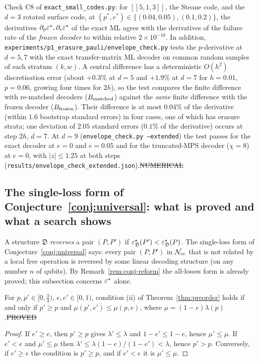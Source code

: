\begin{observation}\label{obs:envelope}
Check C8 of \texttt{exact\_small\_codes.py}: for $[[5,1,3]]$, the Steane code, and the $d=3$ rotated surface code, at $(p^\ast,e^\ast)\in\{(0.04,0.05),(0.1,0.2)\}$,
the derivatives $\partial_p\varepsilon^{\star},\partial_e\varepsilon^{\star}$ of the exact ML agree with the derivatives of the failure rate of the \emph{frozen decoder} to within relative $2\times10^{-10}$.
In addition, \texttt{experiments/p1\_erasure\_pauli/envelope\_check.py} tests the $p$-derivative at $d=5,7$ with the exact transfer-matrix ML decoder on common random samples
of each stratum $(k,w)$. A central difference has a deterministic $O(h^2)$ discretisation error (about $+0.3\%$ at $d=5$ and $+1.9\%$ at $d=7$ for $h=0.01$, $p=0.06$, growing four times for $2h$),
so the test compares the finite difference with re-matched decoders ($B_{\rm matched}$) against the \emph{same} finite difference with the frozen decoder ($B_{\rm frozen}$).
Their difference is at most $0.04\%$ of the derivative (within $1.6$ bootstrap standard errors) in four cases, one of which has erasure strata; one deviation of $2.05$ standard errors ($0.1\%$ of the derivative) occurs at step $2h$, $d=7$.
At $d=9$ (\texttt{envelope\_check.py --extended}) the test passes for the exact decoder at $e=0$ and $e=0.05$ and for the truncated-MPS decoder ($\chi=8$) at $e=0$, with $|z|\le1.25$ at both steps (\texttt{results/envelope\_check\_extended.json}).\hfill\st{NUMERICAL}
\end{observation}

\subsection{The single-loss form of Conjecture~\ref{conj:universal}: what is proved and what a search shows}\label{sec:single-loss}

A structure $\mathfrak D$ \emph{reverses} a pair $(P,P')$ if $\varepsilon^{\star}_{\mathfrak D}(P')<\varepsilon^{\star}_{\mathfrak D}(P)$. The single-loss form of Conjecture~\ref{conj:universal} says: every pair $(P,P')$ in $\mathcal{N}_{\rm cc}$ that is not related by a local free operation is reversed by some linear decoding structure (on any number $n$ of qubits).
By Remark~\ref{rem:conj-reform} the all-losses form is already proved; this subsection concerns $\varepsilon^{\star}$ alone.

\begin{proposition}\label{prop:two-scalars}
For $p,p'\in[0,\tfrac34)$, $e,e'\in[0,1)$, condition (ii) of Theorem~\ref{thm:preorder} holds if and only if $p'\ge p$ and $\mu(p',e')\le\mu(p,e)$, where $\mu=(1-e)\lambda(p)$.\hfill\st{PROVED}
\end{proposition}
\begin{proof}
If $e'\ge e$, then $p'\ge p$ gives $\lambda'\le\lambda$ and $1-e'\le1-e$, hence $\mu'\le\mu$. If $e'<e$ and $\mu'\le\mu$ then $\lambda'\le\lambda(1-e)/(1-e')<\lambda$, hence $p'>p$. Conversely, if $e'\ge e$ the condition is $p'\ge p$, and if $e'<e$ it is $\mu'\le\mu$.
\end{proof}

